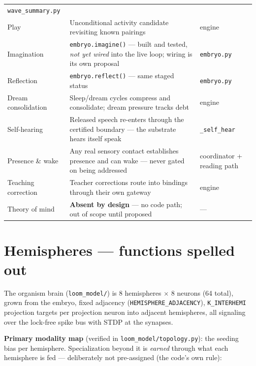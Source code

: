 \documentclass[11pt]{article}
\begin{document}
\begin{longtable}{p{} p{} p{}}
\texttt{wave\_summary.py} \\
Play & Unconditional activity candidate revisiting known pairings &
engine \\
Imagination & \texttt{embryo.imagine()} — built and tested, \emph{not yet
wired} into the live loop; wiring is its own proposal &
\texttt{embryo.py} \\
Reflection & \texttt{embryo.reflect()} — same staged status &
\texttt{embryo.py} \\
Dream consolidation & Sleep/dream cycles compress and consolidate; dream
pressure tracks debt & engine \\
Self-hearing & Released speech re-enters through the certified boundary —
the substrate hears itself speak & \texttt{\_self\_hear} \\
Presence \& wake & Any real sensory contact establishes presence and can
wake — never gated on being addressed & coordinator + reading path \\
Teaching correction & Teacher corrections route into bindings through
their own gateway & engine \\
Theory of mind & \textbf{Absent by design} — no code path; out of scope
until proposed & --- \\
\bottomrule
\end{longtable}

\section{Hemispheres — functions spelled out}\label{sec:hemis}

The organism brain (\texttt{loom\_model/}) is 8 hemispheres $\times$ 8
neurons (64 total), grown from the embryo, fixed adjacency
(\texttt{HEMISPHERE\_ADJACENCY}), \texttt{K\_INTERHEMI} projection targets
per projection neuron into adjacent hemispheres, all signaling over the
lock-free spike bus with STDP at the synapses.

\textbf{Primary modality map} (verified in
\texttt{loom\_model/topology.py}): the seeding bias per hemisphere.
Specialization beyond it is \emph{earned} through what each hemisphere is
fed — deliberately not pre-assigned (the code's own rule):
\end{document}
